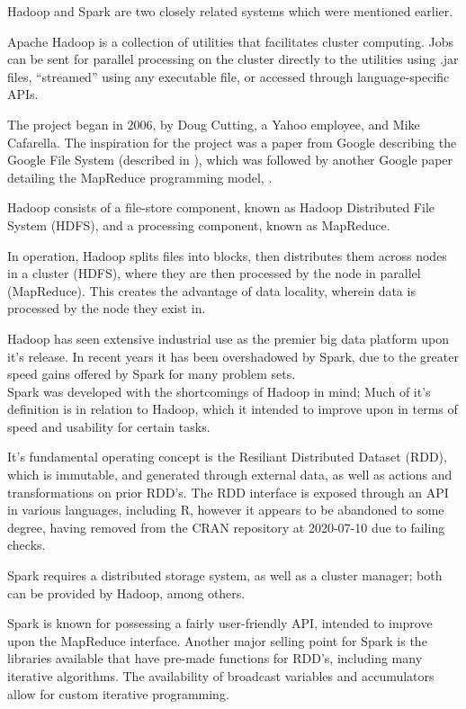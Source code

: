 \documentclass[a4paper,10pt]{article}
\begin{document}
Hadoop and Spark are two closely related systems which were mentioned earlier.

Apache Hadoop is a collection of utilities that facilitates cluster computing. 
Jobs can be sent for parallel processing on the cluster directly to the utilities using .jar files, ``streamed'' using any executable file, or accessed through language-specific APIs.

The project began in 2006, by Doug Cutting, a Yahoo employee, and Mike Cafarella. 
The inspiration for the project was a paper from Google describing the Google File System (described in \textcite{ghemawat2003google}), which was followed by another Google paper detailing the MapReduce programming model, \textcite{dean2004mapreduce}.

Hadoop consists of a file-store component, known as Hadoop Distributed File System (HDFS), and a processing component, known as MapReduce.

In operation, Hadoop splits files into blocks, then distributes them across nodes in a cluster (HDFS), where they are then processed by the node in parallel (MapReduce).
This creates the advantage of data locality, wherein data is processed by the node they exist in.

Hadoop has seen extensive industrial use as the premier big data platform upon it's release. 
In recent years it has been overshadowed by Spark, due to the greater speed gains offered by Spark for many problem sets.\\

Spark was developed with the shortcomings of Hadoop in mind;  Much of it's definition is in relation to Hadoop, which it intended to improve upon in terms of speed and usability for certain tasks\cite{zaharia2010spark}.

It's fundamental operating concept is the Resiliant Distributed Dataset (RDD), which is immutable, and generated through external data, as well as actions and transformations on prior RDD's. 
The RDD interface is exposed through an API in various languages, including R, however it appears to be abandoned to some degree, having removed from the CRAN repository at 2020-07-10 due to failing checks.

Spark requires a distributed storage system, as well as a cluster manager; both can be provided by Hadoop, among others.

Spark is known for possessing a fairly user-friendly API, intended to improve upon the MapReduce interface. 
Another major selling point for Spark is the libraries available that have pre-made functions for RDD's, including many iterative algorithms. 
The availability of broadcast variables and accumulators allow for custom iterative programming.
\end{document}
